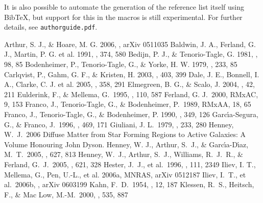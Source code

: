 \documentclass[proceedings, preprint]{rmaa}
\begin{document}
It is also possible to automate the generation of the reference list
itself using BibTeX, but support for this in the macros is still
experimental. For further details, see \texttt{authorguide.pdf}.


\begin{thebibliography}
Arthur, S. J., \& Hoare, M. G.  2006, \apj, arXiv 0511035
Baldwin, J. A.,  Ferland, G. J., Martin, P. G. et al. 1991, \apj, 374, 580 
Bedijn, P. J., \& Tenorio-Tagle, G. 1981, \aap, 98, 85 
Bodenheimer, P., Tenorio-Tagle, G., \& Yorke, H. W. 1979, \apj, 233, 85 
\bibitem[Carlqvist et al.(2003)]{} 
Carlqvist, P., Gahm,  G. F., \& Kristen, H. 2003, \aap, 403, 399 
Dale, J. E., Bonnell, I. A., Clarke, C. J. et al. 2005, \mnras, 358, 291 
Elmegreen, B. G., \& Scalo, J.  2004, \araa, 42, 211 
Eulderink, F., \&  Mellema, G.\ 1995, \aaps, 110, 587 
Ferland, G. J.\ 2000, RMxAC, 9, 153 
Franco, J., Tenorio-Tagle, G., \& Bodenheimer, P.\ 1989, RMxAA, 18, 65 
\bibitem[Franco et al.(1990)]{} 
Franco, J., Tenorio-Tagle, G., \& Bodenheimer, P. 1990, \apj, 349, 126 
Garc\'\i a-Segura, G., \& Franco, J.\ 1996, \apj, 469, 171
Giuliani, J. L.\ 1979, \apj, 233, 280 
 Henney, W.~J.\ 2006
Diffuse Matter from Star Forming Regions to Active Galaxies:
    A Volume Honouring John Dyson. 
Henney, W. J., Arthur, S.~J., \& Garc{\'{\i}}a-D{\'{\i}}az, M.~T.\ 2005, \apj, 627, 813 
Henney, W.~J., Arthur, S.~J., Williams, R.~J.~R., \& Ferland, G.~J.\ 2005, \apj, 621, 328 
Hester, J.~J., et al.\ 1996, \aj, 111, 2349 
Iliev, I. T., Mellema, G., Pen, U.-L., et al.  2006a, MNRAS, arXiv 0512187
Iliev, I.~T., et al.\ 2006b, \mnras, arXiv 0603199
Kahn, F.~D.\ 1954, \bain, 12, 187 
Klessen, R.~S.,  Heitsch, F., \& Mac Low, M.-M.\ 2000, \apj, 535, 887

\end{thebibliography}
\end{document}
